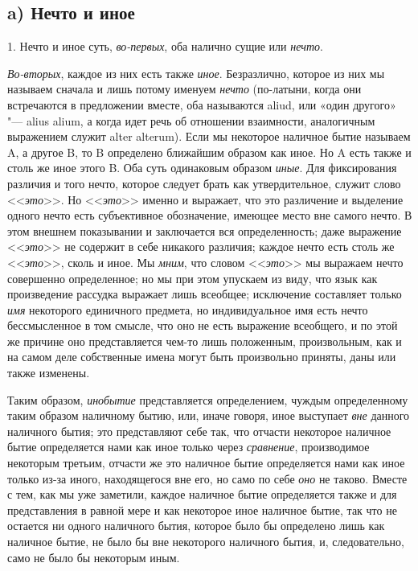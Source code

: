 \subsection[a) Нечто и иное]{a) Нечто и иное}
1. Нечто и иное суть, {\em во-первых}, оба налично
сущие или {\em нечто}.

{\em Во-вторых}, каждое из них есть также
{\em иное}. Безразлично, которое из них мы называем
сначала и лишь потому именуем {\em нечто} (по-латыни,
когда они встречаются в предложении вместе, оба называются aliud, или «один
другого» "--- alius alium, а когда идет речь об отношении взаимности,
аналогичным выражением служит alter alterum). Если мы некоторое наличное
бытие называем A, а другое B, то B определено ближайшим образом как иное.
Но A есть также и столь же иное этого B. Оба суть одинаковым образом
{\em иные}. Для фиксирования различия и того нечто,
которое следует брать как утвердительное, служит слово
<<{\em это}>>. Но <<{\em это}>> именно
и выражает, что это различение и выделение одного нечто есть субъективное
обозначение, имеющее место вне самого нечто. В этом внешнем показывании и
заключается вся определенность; даже выражение
<<{\em это}>> не содержит в себе никакого различия;
каждое нечто есть столь же <<{\em это}>>, сколь и иное.
Мы {\em мним}, что словом
<<{\em это}>> мы выражаем нечто совершенно определенное;
но мы при этом упускаем из виду, что язык как произведение рассудка
выражает лишь всеобщее; исключение составляет только
{\em имя} некоторого единичного предмета, но
индивидуальное имя есть нечто бессмысленное в том смысле, что оно не есть
выражение всеобщего, и по этой же причине оно представляется чем-то лишь
положенным, произвольным, как и на самом деле собственные имена могут быть
произвольно приняты, даны или также изменены.

Таким образом, {\em инобытие} представляется
определением, чуждым определенному таким образом наличному бытию, или,
иначе говоря, иное выступает {\em вне} данного
наличного бытия; это представляют себе так, что отчасти некоторое наличное
бытие определяется нами как иное только через
{\em сравнение}, производимое некоторым третьим,
отчасти же это наличное бытие определяется нами как иное только из-за
иного, находящегося вне его, но само по себе
{\em оно} не таково. Вместе с тем, как мы уже заметили,
каждое наличное бытие определяется также и для представления в равной мере
и как некоторое иное наличное бытие, так что не остается ни одного
наличного бытия, которое было бы определено лишь как наличное бытие, не
было бы вне некоторого наличного бытия, и, следовательно, само не было бы
некоторым иным.

